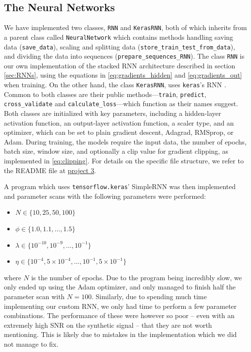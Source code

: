 \documentclass[%
reprint,
amsmath,amssymb,
aps,
]{revtex4-2}
\begin{document}
\subsection{The Neural Networks}
We have implemented two classes, \texttt{RNN} and \texttt{KerasRNN}, both of which inherits from a parent class called \texttt{NeuralNetwork} which contains methods handling saving data (\texttt{save\_data}), 
scaling and splitting data (\texttt{store\_train\_test\_from\_data}), and dividing the data into sequences (\texttt{prepare\_sequences\_RNN}). The class \texttt{RNN} is our own implementation of the stacked RNN architecture described in section \ref{sec:RNNs}, using the equations in \eqref{eq:gradients_hidden} and \eqref{eq:gradients_out} when training. On the other hand, the class \texttt{KerasRNN}, uses \texttt{keras}'s RNN \cite{keras_recurrent_layers}. Common to both classes are their public methods—\texttt{train}, \texttt{predict}, \texttt{cross\_validate} and \texttt{calculate\_loss}—which function as their names suggest. Both classes are initialized with key parameters, including a hidden-layer activation function, an output-layer activation function, a scaler type, and an optimizer, which can be set to plain gradient descent, Adagrad, RMSprop, or Adam. During training, the models require the input data, the number of epochs, batch size, window size, and optionally a clip value for gradient clipping, as implemented in \eqref{eq:clipping}. For details on the specific file structure, we refer to the README file at \href{https://github.com/EdvardRornes/FYS-STK4155/tree/main/Project3}{project 3}.

A program which uses \texttt{tensorflow.keras}' SimpleRNN was then implemented and parameter scans with the following parameters were performed:
\begin{itemize}
	\item $N\in\{10,25,50,100\}$
	\item $\phi\in\{1.0,1.1,...,1.5\}$
	\item $\lambda\in\{10^{-10},10^{-9},...,10^{-1}\}$
	\item $\eta\in\{10^{-4},5\times10^{-4},...,10^{-1},5\times10^{-1}\}$
\end{itemize}
where $N$ is the number of epochs. Due to the program being incredibly slow, we only ended up using the Adam optimizer, and only managed to finish half the parameter scan with $N=100$. Similarly, due to spending much time implementing our custom RNN, we only had time to perform a few parameter combinations. The performance of these were however so poor -- even with an extremely high SNR on the synthetic signal -- that they are not worth mentioning. This is likely due to mistakes in the implementation which we did not manage to fix.
\end{document}
